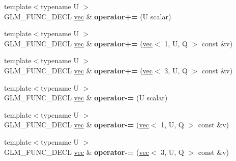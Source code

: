 \begin{DoxyCompactItemize}
\item 
\mbox{\label{structglm_1_1vec_3_013_00_01T_00_01Q_01_4_a342066932ae10cf28589b8cd845edb7c}} 
{\footnotesize template$<$typename U $>$ }\\G\+L\+M\+\_\+\+F\+U\+N\+C\+\_\+\+D\+E\+CL \hyperlink{structglm_1_1vec}{vec} \& {\bfseries operator+=} (U scalar)
\item 
\mbox{\label{structglm_1_1vec_3_013_00_01T_00_01Q_01_4_a63f2591742e886ac84b03e2ad7157b2f}} 
{\footnotesize template$<$typename U $>$ }\\G\+L\+M\+\_\+\+F\+U\+N\+C\+\_\+\+D\+E\+CL \hyperlink{structglm_1_1vec}{vec} \& {\bfseries operator+=} (\hyperlink{structglm_1_1vec}{vec}$<$ 1, U, Q $>$ const \&v)
\item 
\mbox{\label{structglm_1_1vec_3_013_00_01T_00_01Q_01_4_af225b4b2d835609198480cd692c088d8}} 
{\footnotesize template$<$typename U $>$ }\\G\+L\+M\+\_\+\+F\+U\+N\+C\+\_\+\+D\+E\+CL \hyperlink{structglm_1_1vec}{vec} \& {\bfseries operator+=} (\hyperlink{structglm_1_1vec}{vec}$<$ 3, U, Q $>$ const \&v)
\item 
\mbox{\label{structglm_1_1vec_3_013_00_01T_00_01Q_01_4_a095c0fe97fff65c3ef77bdb0c41a747f}} 
{\footnotesize template$<$typename U $>$ }\\G\+L\+M\+\_\+\+F\+U\+N\+C\+\_\+\+D\+E\+CL \hyperlink{structglm_1_1vec}{vec} \& {\bfseries operator-\/=} (U scalar)
\item 
\mbox{\label{structglm_1_1vec_3_013_00_01T_00_01Q_01_4_a9b8dba9adb57ad50b1f22fdf3864407e}} 
{\footnotesize template$<$typename U $>$ }\\G\+L\+M\+\_\+\+F\+U\+N\+C\+\_\+\+D\+E\+CL \hyperlink{structglm_1_1vec}{vec} \& {\bfseries operator-\/=} (\hyperlink{structglm_1_1vec}{vec}$<$ 1, U, Q $>$ const \&v)
\item 
\mbox{\label{structglm_1_1vec_3_013_00_01T_00_01Q_01_4_af172872e811a8262f44dc83a9784354e}} 
{\footnotesize template$<$typename U $>$ }\\G\+L\+M\+\_\+\+F\+U\+N\+C\+\_\+\+D\+E\+CL \hyperlink{structglm_1_1vec}{vec} \& {\bfseries operator-\/=} (\hyperlink{structglm_1_1vec}{vec}$<$ 3, U, Q $>$ const \&v)

\end{DoxyCompactItemize}
